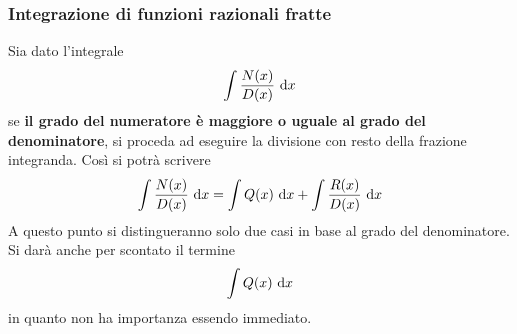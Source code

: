 \subsubsection{Integrazione di funzioni razionali fratte}
Sia dato l'integrale
\begin{equation*}
  \int \frac{N(x)}{D(x)}\,\mathop{}\!\mathrm{d} x
\end{equation*}
se \textbf{il grado del numeratore è maggiore o uguale al grado del denominatore}, si proceda ad
eseguire la divisione con resto della frazione integranda. Così si potrà scrivere
\begin{equation*}
  \int \frac{N(x)}{D(x)}\,\mathop{}\!\mathrm{d} x = \int Q(x)\,\mathop{}\!\mathrm{d} x + \int \frac{R(x)}{D(x)}\,\mathop{}\!\mathrm{d} x
\end{equation*}
A questo punto si distingueranno solo due casi in base al grado del denominatore. Si darà anche per
scontato il termine
\begin{equation*}
  \int Q(x)\,\mathop{}\!\mathrm{d} x
\end{equation*}
in quanto non ha importanza essendo immediato.
